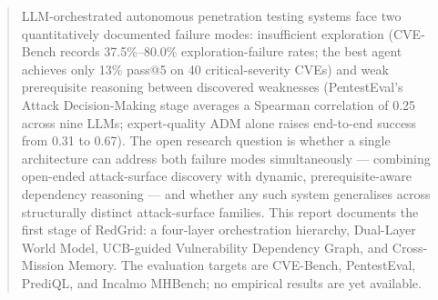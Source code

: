 \begin{abstract}

	\hspace{1cm} LLM-orchestrated autonomous penetration testing systems face two quantitatively documented failure modes: insufficient exploration (CVE-Bench records 37.5\%--80.0\% exploration-failure rates; the best agent achieves only 13\% pass@5 on 40 critical-severity CVEs) and weak prerequisite reasoning between discovered weaknesses (PentestEval's Attack Decision-Making stage averages a Spearman correlation of 0.25 across nine LLMs; expert-quality ADM alone raises end-to-end success from 0.31 to 0.67). The open research question is whether a single architecture can address both failure modes simultaneously --- combining open-ended attack-surface discovery with dynamic, prerequisite-aware dependency reasoning --- and whether any such system generalises across structurally distinct attack-surface families. This report documents the first stage of RedGrid: a four-layer orchestration hierarchy, Dual-Layer World Model, UCB-guided Vulnerability Dependency Graph, and Cross-Mission Memory. The evaluation targets are CVE-Bench, PentestEval, PrediQL, and Incalmo MHBench; no empirical results are yet available.

\end{abstract}

\clearpage
{}
